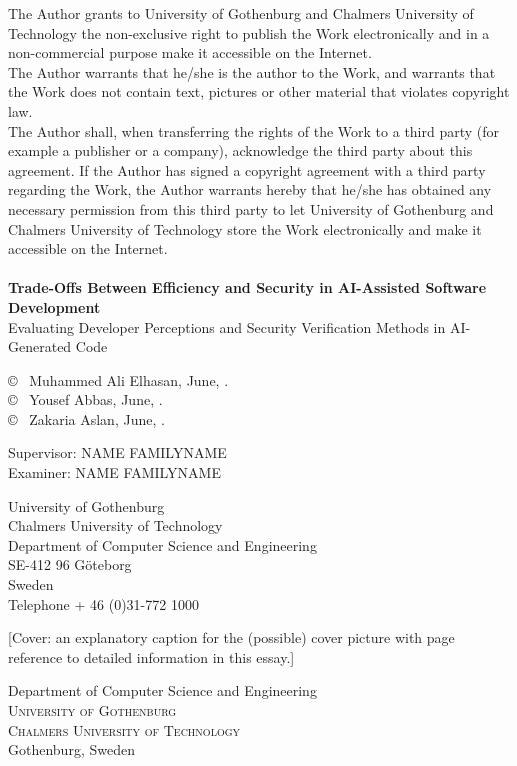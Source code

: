 \documentclass[12pt,a4paper,twoside,openright]{report}
\newcommand{\backgroundpic}[3]{
	\put(#1,#2){
	\parbox[b][\paperheight]{\paperwidth}{
	\centering
	\texttt{[image: \#3]}}}}
\begin{document}
\newpage
\AddToShipoutPicture*{\backgroundpic{-4}{56.7}{frontpage_gu_eng_vec_m2.pdf}}
\addtolength{\voffset}{2cm}
\thispagestyle{empty}
The Author grants to University of Gothenburg and Chalmers University of Technology the non-exclusive right to publish the Work electronically and in a non-commercial purpose make it accessible on the Internet.\\
The Author warrants that he/she is the author to the Work, and warrants that the Work does not contain text, pictures or other material that violates copyright law. \\

The Author shall, when transferring the rights of the Work to a third party (for example a publisher or a company), acknowledge the third party about this agreement. If the Author has signed a copyright agreement with a third party regarding the Work, the Author warrants hereby that he/she has obtained any necessary permission from this third party to let University of Gothenburg and Chalmers University of Technology store the Work electronically and make it accessible on the Internet.\\ \\

\textbf{Trade-Offs Between Efficiency and Security in AI-Assisted Software Development}\\
Evaluating Developer Perceptions and Security Verification Methods in AI-Generated Code\

\copyright ~ Muhammed Ali Elhasan, June, \the\year. \setlength{\parskip}{1cm} \\
\copyright ~ Yousef Abbas, June, \the\year. \setlength{\parskip}{1cm} \\
\copyright ~ Zakaria Aslan, June, \the\year. \setlength{\parskip}{1cm}

Supervisor: NAME FAMILYNAME\\
Examiner: NAME FAMILYNAME \setlength{\parskip}{1cm}


University of Gothenburg\\
Chalmers University of Technology\\
Department of Computer Science and Engineering\\
SE-412 96 G{\"o}teborg\\
Sweden\\
Telephone + 46 (0)31-772 1000 \setlength{\parskip}{0.5cm}

[Cover:
an explanatory caption for the (possible) cover picture
with page reference to detailed information in this essay.] \setlength{\parskip}{3cm}

Department of Computer Science and Engineering \\
\textsc{University of Gothenburg} \\
\textsc{Chalmers University of Technology} \\
Gothenburg, Sweden \the\year
\end{document}
